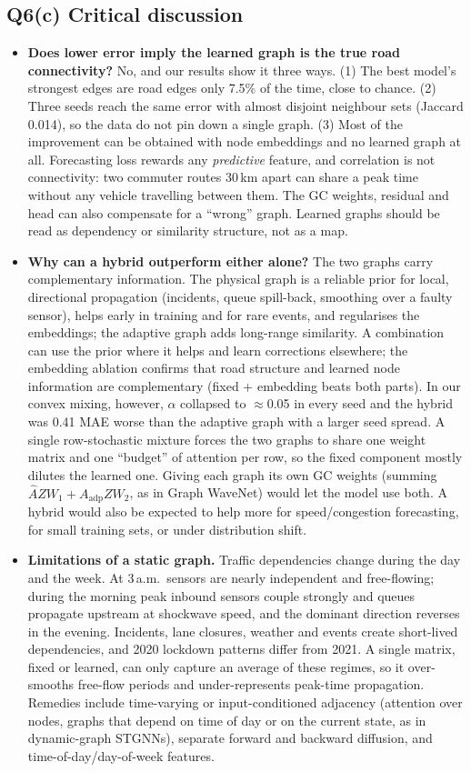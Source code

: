 \documentclass[11pt,a4paper]{article}
\begin{document}
\subsection{Q6(c) Critical discussion}
\begin{itemize}
\item \textbf{Does lower error imply the learned graph is the true road connectivity?} No, and our results show it three ways.
(1) The best model's strongest edges are road edges only 7.5\% of the time, close to chance. (2) Three seeds reach the same error
with almost disjoint neighbour sets (Jaccard 0.014), so the data do not pin down a single graph. (3) Most of the improvement can be
obtained with node embeddings and no learned graph at all. Forecasting loss rewards any \emph{predictive} feature, and correlation
is not connectivity: two commuter routes 30\,km apart can share a peak time without any vehicle travelling between them. The GC
weights, residual and head can also compensate for a ``wrong'' graph. Learned graphs should be read as dependency or similarity
structure, not as a map.
\item \textbf{Why can a hybrid outperform either alone?} The two graphs carry complementary information. The physical graph is a
reliable prior for local, directional propagation (incidents, queue spill-back, smoothing over a faulty sensor), helps early in
training and for rare events, and regularises the embeddings; the adaptive graph adds long-range similarity. A combination can use
the prior where it helps and learn corrections elsewhere; the embedding ablation confirms that road structure and learned node
information are complementary (fixed + embedding beats both parts). In our convex mixing, however, $\alpha$ collapsed to $\approx$0.05
in every seed and the hybrid was 0.41 MAE worse than the adaptive graph with a larger seed spread. A single row-stochastic mixture
forces the two graphs to share one weight matrix and one ``budget'' of attention per row, so the fixed component mostly dilutes the
learned one. Giving each graph its own GC weights (summing $\hat A ZW_1+A_{\text{adp}}ZW_2$, as in Graph WaveNet) would let the model
use both. A hybrid would also be expected to help more for speed/congestion forecasting, for small training sets, or under
distribution shift.
\item \textbf{Limitations of a static graph.} Traffic dependencies change during the day and the week. At 3\,a.m.\ sensors are
nearly independent and free-flowing; during the morning peak inbound sensors couple strongly and queues propagate upstream at
shockwave speed, and the dominant direction reverses in the evening. Incidents, lane closures, weather and events create
short-lived dependencies, and 2020 lockdown patterns differ from 2021. A single matrix, fixed or learned, can only capture an
average of these regimes, so it over-smooths free-flow periods and under-represents peak-time propagation. Remedies include
time-varying or input-conditioned adjacency (attention over nodes, graphs that depend on time of day or on the current state, as in
dynamic-graph STGNNs), separate forward and backward diffusion, and time-of-day/day-of-week features.
\end{itemize}
\end{document}
